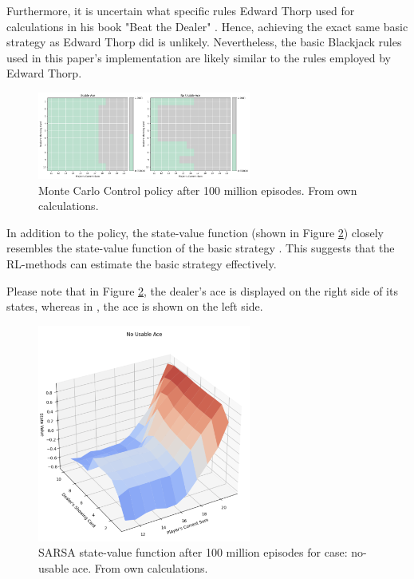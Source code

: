 \documentclass[conference]{IEEEtran}
\begin{document}
Furthermore, it is uncertain what specific rules Edward Thorp used for calculations in his book "Beat the Dealer" \cite{b1}. Hence, achieving the exact same basic strategy as Edward Thorp did \cite{b1} is unlikely. Nevertheless, the basic Blackjack rules used in this paper's implementation are likely similar to the rules employed by Edward Thorp.

\begin{figure}
	\centering
	\includegraphics[width=70mm]{figures/MC/basic-100-million/policy.png}
	\caption{Monte Carlo Control policy after 100 million episodes. From own calculations.}
	\label{fig:monte-carlo-basic-strategy}
\end{figure}

In addition to the policy, the state-value function (shown in Figure \ref{fig:sarsa-state-value-basic}) closely resembles the state-value function of the basic strategy \cite{b4}. This suggests that the RL-methods can estimate the basic strategy effectively.

Please note that in Figure \ref{fig:sarsa-state-value-basic}, the dealer's ace is displayed on the right side of its states, whereas in \cite{b4}, the ace is shown on the left side.

\begin{figure}
	\centering
	\includegraphics[width=70mm]{figures/MC/basic-100-million/value-function-no-usuable-ace.png}
	\caption{SARSA state-value function after 100 million episodes for case: no-usable ace. From own calculations.}
	\label{fig:sarsa-state-value-basic}
\end{figure}
\end{document}
